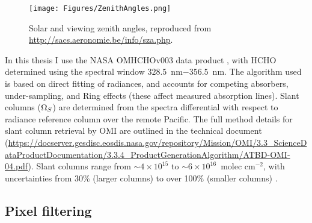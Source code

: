   
  \begin{figure}\begin{center}
      \texttt{[image: Figures/ZenithAngles.png]}
      \caption{Solar and viewing zenith angles, reproduced from \url{http://sacs.aeronomie.be/info/sza.php}. %
        }
      \label{ch_HCHO:fig:zenithangle}
    \end{center}\end{figure}
  
  In this thesis I use the NASA OMHCHOv003 data product \parencite{Abad2015}, with HCHO determined using the spectral window $328.5$~nm$ - 356.5$~nm. 
  The algorithm used is based on direct fitting of radiances, and accounts for competing absorbers, under-sampling, and Ring effects (these affect measured absorption lines).
  Slant columns ($\Omega_{S}$) are determined from the spectra differential with respect to radiance reference column over the remote Pacific.
  The full method details for slant column retrieval by OMI are outlined 
  in the technical document (\url{https://docserver.gesdisc.eosdis.nasa.gov/repository/Mission/OMI/3.3_ScienceDataProductDocumentation/3.3.4_ProductGenerationAlgorithm/ATBD-OMI-04.pdf}).
  Slant columns range from $\sim 4\times 10^{15} $ to $\sim 6 \times 10^{16}$~molec cm$^{-2}$, with uncertainties from 30\% (larger columns) to over 100\% (smaller columns) \parencite{Abad2015}.
  

  \subsection{Pixel filtering}
  \label{Model:omhcho:pixel_filtering}
  
